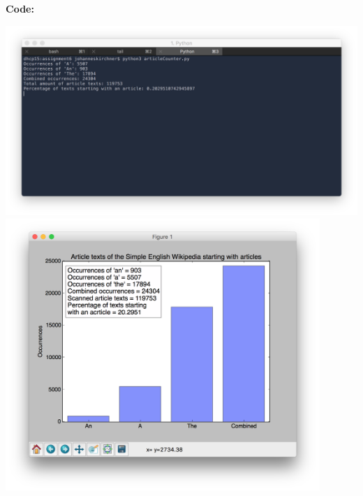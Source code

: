 \documentclass{WeSTassignment}
\begin{document}
\textbf{Code:}

\hspace*{-100px}
\includegraphics[width=610px]{console_output}
\includegraphics[width=450px]{figure_2}







\makefooter
\end{document}
